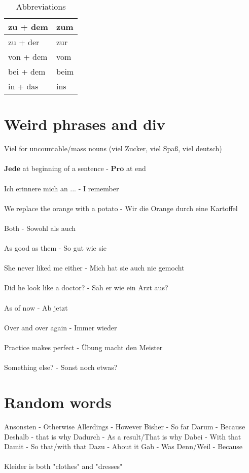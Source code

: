 \documentclass{article}
\begin{document}
\begin{table}[H]
    \centering
    \begin{tabu} to 0.4\textwidth { | X[l] | X[r] | }
        \hline
        zu + dem & zum\\
        \hline
        zu + der &  zur\\
        \hline
        von + dem &  vom\\
        \hline
        bei + dem &  beim\\
        \hline
        in + das &  ins\\
        \hline
    \end{tabu}
    \caption{Abbreviations}
    \label{tab:abbreviations}
\end{table}


\section{Weird phrases and div}
Viel for uncountable/mass nouns (viel Zucker, viel Spaß, viel deutsch) 
\\ \\
$\textbf{Jede}$ at beginning of a sentence - $\textbf{Pro}$ at end
\\ \\
Ich erinnere mich an ... - I remember
\\ \\
We replace the orange with a potato - Wir  die Orange durch eine Kartoffel
\\ \\
Both - Sowohl als auch
\\ \\
As good as them - So gut wie sie
\\ \\
She never liked me either - Mich hat sie auch nie gemocht
\\ \\
Did he look like a doctor? - Sah er wie ein Arzt aus?
\\ \\
As of now - Ab jetzt
\\ \\
Over and over again - Immer wieder
\\ \\
Practice makes perfect - Übung macht den Meister
\\ \\
Something else? - Sonst noch etwas?


\section{Random words}
Ansonsten - Otherwise
Allerdings - However
Bisher - So far
Darum - Because
Deshalb - that is why
Dadurch - As a result/That is why
Dabei - With that
Damit - So that/with that
Dazu - About it
Gab - Was
Denn/Weil - Because
\\ \\
Kleider is both "clothes" and "dresses"
\end{document}
